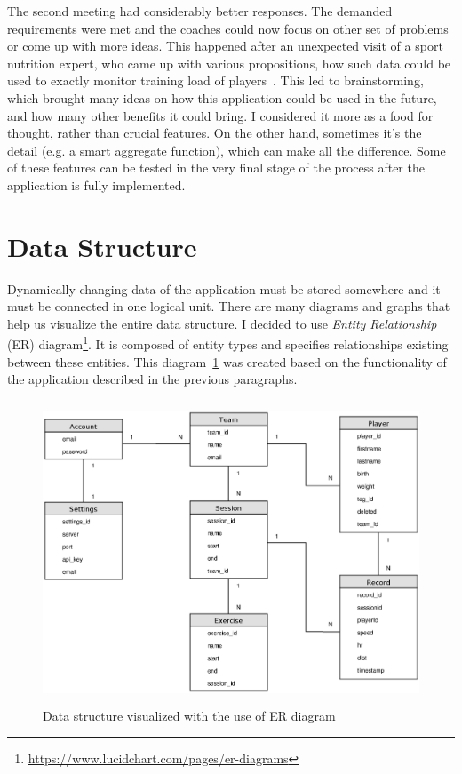 The second meeting had considerably better responses. The demanded requirements were met and the coaches could now focus on other set of problems or come up with more ideas. This happened after an unexpected visit of a sport nutrition expert, who came up with various propositions, how such data could be used to exactly monitor training load of players~\cite{TrainingLoad}. This led to brainstorming, which brought many ideas on how this application could be used in the future, and how many other benefits it could bring.
I considered it more as a food for thought, rather than crucial features. On the other hand, sometimes it’s the detail (e.g. a smart aggregate function), which can make all the difference. Some of these features can be tested in the very final stage of the process after the application is fully implemented. 

\section{Data Structure}
Dynamically changing data of the application must be stored somewhere and it must be connected in one logical unit. There are many diagrams and graphs that help us visualize the entire data structure. I decided to use \textit{Entity Relationship} (ER) diagram\footnote{\url{https://www.lucidchart.com/pages/er-diagrams}}. It is composed of entity types and specifies relationships existing between these entities. This diagram~\ref{img:er_diagram} was created based on the functionality of the application described in the previous paragraphs.

\begin{figure}[htb]
\begin{center}
  \includegraphics*[height=9cm,keepaspectratio,trim={0 9cm 0 4cm}]{images/er_diagram}
\end{center}
\caption{Data structure visualized with the use of ER diagram}
\label{img:er_diagram}
\end{figure}

